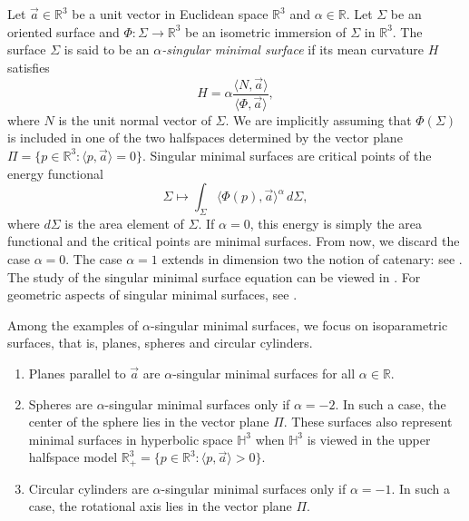 \documentclass{birkjour}
\theoremstyle{definition}
\theoremstyle{remark}
\numberwithin{equation}{section}
\def\r{\mathbb R}
\def\h{\mathbb H}
\begin{document}
 Let $\vec{a}\in\r^3$ be a unit vector in Euclidean space $\r^3$ and $\alpha\in\r$. Let $\Sigma$ be an oriented surface and $\Phi\colon\Sigma\to\r^3$ be an isometric immersion of $\Sigma$ in $\r^3$. The surface $\Sigma$ is said to be an {\it $\alpha$-singular  minimal surface} if its mean curvature $H$ satisfies
 \begin{equation}\label{eq1}
 H=\alpha\frac{\langle N,\vec{a}\rangle}{\langle\Phi,\vec{a}\rangle},
 \end{equation}
 where $N$ is the unit normal vector of $\Sigma$. We are implicitly assuming that  $\Phi(\Sigma)$ is included in one of the two halfspaces determined by the vector plane $\Pi=\{p\in\r^3\colon\langle  p,\vec{a}\rangle=0\}$. Singular minimal surfaces are   critical points of the energy functional 
 $$\Sigma\mapsto\int_\Sigma \langle\Phi(p),\vec{a}\rangle^\alpha\, d\Sigma,$$
 where $d\Sigma$ is the area element of $\Sigma$. If $\alpha=0$, this energy is simply the area functional and the critical points are minimal surfaces. From now, we discard the case $\alpha=0$. The case $\alpha=1$ extends in dimension two the notion of catenary: see \cite{bht,dh,ni}. The study of the singular minimal surface equation can be viewed in \cite{bd,di1,di2,lo3,lo4}. For  geometric aspects of singular minimal surfaces, see \cite{dg,dl,lo1,lo2}.  

Among the examples of $\alpha$-singular minimal surfaces, we focus on isoparametric surfaces, that is,  planes, spheres and circular cylinders. 
\begin{enumerate}
\item Planes parallel to $\vec{a}$ are $\alpha$-singular minimal surfaces for all $\alpha\in\r$. 
\item Spheres are $\alpha$-singular minimal surfaces only if $\alpha=-2$. In such a case, the center of the sphere lies in the vector plane $\Pi$. These surfaces also represent minimal surfaces in hyperbolic space $\mathbb{H}^3$ when $\h^3$ is viewed in the  upper halfspace model   $\r^3_+=\{p\in\r^3\colon\langle p,\vec{a}\rangle>0\}$. 
\item Circular cylinders are   $\alpha$-singular minimal surfaces only if $\alpha=-1$. In such a case, the rotational axis lies in the vector plane $\Pi$. 
\end{enumerate}
\end{document}

